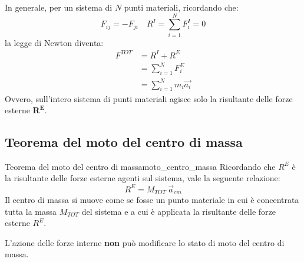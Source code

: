\documentclass[12pt]{report}
\newcounter{theorem}
\newcommand{\nmu}{}
\begin{document}
	\begin{note}{}{}
		In generale, per un sistema di $N$ punti materiali, ricordando che:
		\[
		F_{ij} = -F_{ji} \quad R^I = \sum_{i=1}^{N}F_i^I = 0
		\]
		la legge di Newton diventa:
		\begin{align*}
		F^{TOT} &= R^I + R^E \\
		&= \sum_{i=1}^{N}F_i^E \\
		&= \sum_{i=1}^{N}m_i\vec{a_i}
		\end{align*}
		Ovvero, sull'intero sistema di punti materiali agisce solo la risultante delle forze esterne $\mathbf{R^E}$.
	\end{note}
	\subsection{Teorema del moto del centro di massa}
	\begin{theorem}{\nmu Teorema del moto del centro di massa}{moto_centro_massa}
		Ricordando che $R^E$ è la risultante delle forze esterne agenti sul sistema, vale la seguente relazione:
		\[
		R^E = M_{TOT}\ \vec{a}_{cm}
		\]
		Il centro di massa si muove come se fosse un punto materiale in cui è concentrata tutta la massa $M_{TOT}$ del sistema e a cui è applicata la risultante delle forze esterne $R^E$.
	\end{theorem}
	\begin{note}{}{}
		L'azione delle forze interne \textbf{non} può modificare lo stato di moto del centro di massa.
	\end{note}
\end{document}
